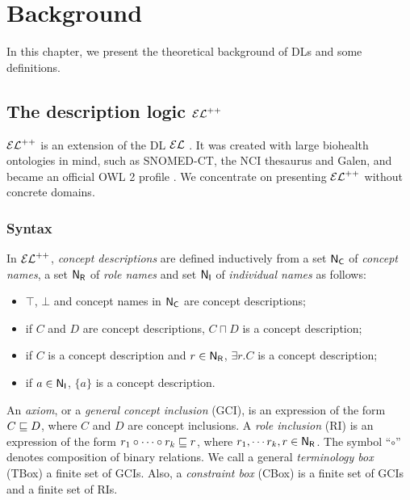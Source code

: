 
\chapter{Background}
\label{cap:background}

In this chapter, we present the theoretical background of DLs and some definitions. 

\section{The description logic \texorpdfstring{$\mathcal{EL}^{++}$}{𝓔𝓛++}}

$\mathcal{EL}^{++}$ is an extension of the DL $\mathcal{EL}$ \citep{Baader2005a}. It was created with large biohealth ontologies in mind, such as SNOMED-CT, the NCI thesaurus and Galen, and became an official OWL 2 profile \citep{owl2}. We concentrate on presenting $\mathcal{EL}^{++}$ without concrete domains. 

\subsection{Syntax}
In $\mathcal{EL}^{++}$, \emph{concept descriptions} are defined inductively from a set $\mathsf{N_C}$ of \emph{concept names}, a set $\mathsf{N_R}$ of \emph{role names} and set $\mathsf{N_I}$ of \emph{individual names} as follows:
\begin{itemize}
  \item $\top$, $\bot$ and concept names in $\mathsf{N_C}$ are concept descriptions;
  \item if $C$ and $D$ are concept descriptions, $C \sqcap D$ is a concept description;
  \item if $C$ is a concept description and $r \in \mathsf{N_R}$, $\exists r.C$ is a concept description;
  \item if $a \in \mathsf{N_I}$, $\{a\}$ is a concept description.
\end{itemize}

An \emph{axiom}, or a \emph{general concept inclusion} (GCI), is an expression of the form $C \sqsubseteq D$, where $C$ and $D$ are concept inclusions. A \emph{role inclusion} (RI) is an expression of the form $r_1 \circ \cdots \circ r_k \sqsubseteq r$, where $r_1, \cdots r_k, r \in \mathsf{N_R}$.  The symbol ``$\circ$'' denotes composition of binary relations. We call a general \emph{terminology box} (TBox) a finite set of GCIs. Also, a \emph{constraint box} (CBox) is a finite set of GCIs and a finite set of RIs. 

